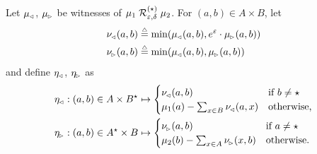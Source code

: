 \documentclass{lmcs}
\begin{document}
\proofatend
  Let $\mu\lside$, $\mu\rside$ be witnesses of
  $\mu_1 \aliftnew{\rR}{\epsilon, \delta} \mu_2$.
  For $(a, b) \in A \times B$, let
  \begin{align*}
    \nu\lside(a, b) &\eqdef \min(\mu\lside(a, b), e^\epsilon \cdot \mu\rside(a, b))\\
    \nu\rside(a, b) &\eqdef \min(\mu\lside(a, b), \mu\rside(a, b))
  \end{align*}
  and define $\eta\lside$, $\eta\rside$ as
  \begin{align*}
    \eta\lside &: (a, b) \in A \times B^\star \mapsto \begin{cases}
      \nu\lside(a, b) & \text{if $b \neq \star$}\\
      \mu_1(a) - \sum_{x \in B} \nu\lside(a, x) & \text{otherwise,}
    \end{cases} \\
    \eta\rside &: (a, b) \in A^\star \times B \mapsto \begin{cases}
      \nu\rside(a, b) & \text{if $a \neq \star$}\\
      \mu_2(b) - \sum_{x \in A} \nu\rside(x, b) & \text{otherwise}.
    \end{cases}
  \end{align*}
\end{document}
